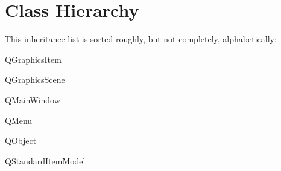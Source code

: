 \section{Class Hierarchy}
This inheritance list is sorted roughly, but not completely, alphabetically\+:\begin{DoxyCompactList}
\item {}
\item Q\+Graphics\+Item\begin{DoxyCompactList}
\item {}
\begin{DoxyCompactList}
\item {}
\item {}
\item {}
\end{DoxyCompactList}
\end{DoxyCompactList}
\item Q\+Graphics\+Scene\begin{DoxyCompactList}
\item {}
\end{DoxyCompactList}
\item Q\+Main\+Window\begin{DoxyCompactList}
\item {}
\end{DoxyCompactList}
\item Q\+Menu\begin{DoxyCompactList}
\item {}
\end{DoxyCompactList}
\item Q\+Object\begin{DoxyCompactList}
\item {}
\item {}
\end{DoxyCompactList}
\item Q\+Standard\+Item\+Model\begin{DoxyCompactList}
\item {}
\end{DoxyCompactList}
\end{DoxyCompactList}
